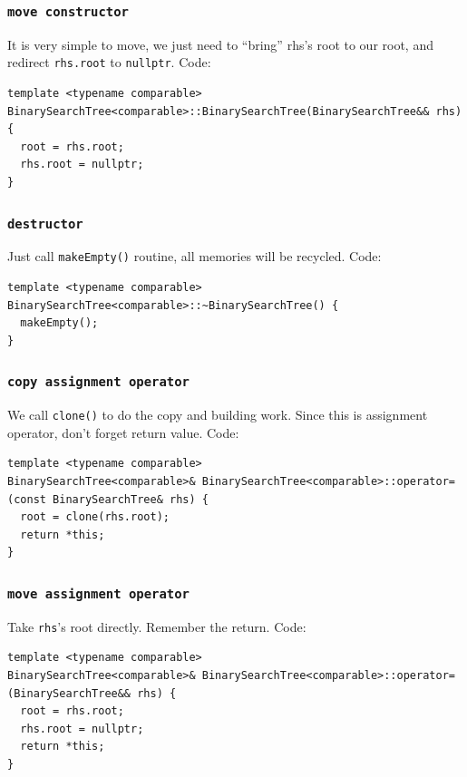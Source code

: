 \documentclass[11pt]{book}
\begin{document}
\subsubsection{\texttt{move constructor}}
\label{sec:org0f52297}
It is very simple to move, we just need to ``bring'' rhs's root to our root, and redirect \texttt{rhs.root} to \texttt{nullptr}. Code:
\begin{verbatim}
template <typename comparable>
BinarySearchTree<comparable>::BinarySearchTree(BinarySearchTree&& rhs) {
  root = rhs.root;
  rhs.root = nullptr;
}
\end{verbatim}

\subsubsection{\texttt{destructor}}
\label{sec:org157d77b}
Just call \texttt{makeEmpty()} routine, all memories will be recycled. Code:
\begin{verbatim}
template <typename comparable>
BinarySearchTree<comparable>::~BinarySearchTree() {
  makeEmpty();
}
\end{verbatim}

\subsubsection{\texttt{copy assignment operator}}
\label{sec:orgd155ea9}
We call \texttt{clone()} to do the copy and building work. Since this is assignment operator, don't forget return value. Code:
\begin{verbatim}
template <typename comparable>
BinarySearchTree<comparable>& BinarySearchTree<comparable>::operator=(const BinarySearchTree& rhs) {
  root = clone(rhs.root);
  return *this;
}
\end{verbatim}

\subsubsection{\texttt{move assignment operator}}
\label{sec:org65c71d2}
Take \texttt{rhs}'s root directly. Remember the return. Code:
\begin{verbatim}
template <typename comparable>
BinarySearchTree<comparable>& BinarySearchTree<comparable>::operator=(BinarySearchTree&& rhs) {
  root = rhs.root;
  rhs.root = nullptr;
  return *this;
}
\end{verbatim}
\end{document}
